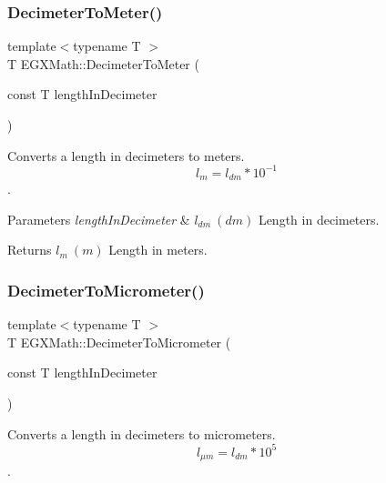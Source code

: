 \subsubsection{\texorpdfstring{Decimeter\+To\+Meter()}{DecimeterToMeter()}}
{\footnotesize\ttfamily template$<$typename T $>$ \\
T E\+G\+X\+Math\+::\+Decimeter\+To\+Meter (\begin{DoxyParamCaption}\item[{const T}]{length\+In\+Decimeter }\end{DoxyParamCaption})}



Converts a length in decimeters to meters. \[ l_{m}=l_{dm} * 10^{-1} \]. 


\begin{DoxyParams}{Parameters}
{\em length\+In\+Decimeter} & $ l_{dm}\ (dm)$ Length in decimeters. \\
\hline
\end{DoxyParams}
\begin{DoxyReturn}{Returns}
$ l_{m}\ (m)$ Length in meters. 
\end{DoxyReturn}
\mbox{\label{group___e_g_x_math-_conversions-_length_conversions-_s_i-_decimeter-_s_i_ga5cf28083fa005b5a6a0dd6817c1633b7}} 
\subsubsection{\texorpdfstring{Decimeter\+To\+Micrometer()}{DecimeterToMicrometer()}}
{\footnotesize\ttfamily template$<$typename T $>$ \\
T E\+G\+X\+Math\+::\+Decimeter\+To\+Micrometer (\begin{DoxyParamCaption}\item[{const T}]{length\+In\+Decimeter }\end{DoxyParamCaption})}



Converts a length in decimeters to micrometers. \[ l_{\mu m}=l_{dm} * 10^{5} \]. 

